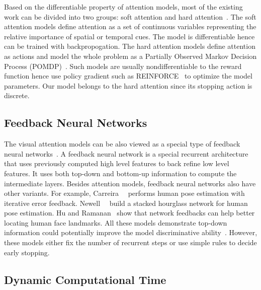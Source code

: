 \documentclass[10pt,twocolumn,letterpaper]{article}
\begin{document}
Based on the differentiable property of attention models, most of the existing work can be divided into two groups: soft attention and hard attention~\cite{xu2015show}.
The soft attention models define attention as a set of continuous variables representing the relative importance of spatial or temporal cues.
The model is differentiable hence can be trained with backpropogation.
The hard attention models define attention as actions and model the whole problem as a Partially Observed Markov Decision Process (POMDP)~\cite{sutton1998reinforcement}.
Such models are usually nondifferentiable to the reward function hence use policy gradient such as REINFORCE~\cite{sutton1999policy} to optimize the model parameters.
Our model belongs to the hard attention since its stopping action is discrete.

\subsection{Feedback Neural Networks}

The visual attention models can be also viewed as a special type of feedback neural networks~\cite{zamir2016feedback, stollenga2014deep, cao2015look, wang2014attentional}.
A feedback neural network is a special recurrent architecture that uses previously computed high level features to back refine low level features.
It uses both top-down and bottom-up information to compute the intermediate layers.
Besides attention models, feedback neural networks also have other variants.
For example, Carreira~\etal~\cite{carreira2016human} performs human pose estimation with iterative error feedback.
Newell~\etal~\cite{newell2016stacked} build a stacked hourglass network for human pose estimation.
Hu and Ramanan~\cite{hu2016bottom} show that network feedbacks can help better locating human face landmarks.
All these models demonstrate top-down information could potentially improve the model discriminative ability~\cite{zamir2016feedback}.
However, these models either fix the number of recurrent steps or use simple rules to decide early stopping.

\subsection{Dynamic Computational Time}
\end{document}
